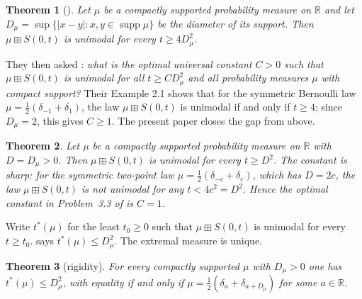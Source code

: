 \documentclass[11pt]{amsart}
\newtheorem{theorem}{Theorem}[section]
\theoremstyle{definition}
\newcommand{\R}{\mathbb{R}}
\newcommand{\bp}{\boxplus}
\newcommand{\supp}{\operatorname{supp}}
\begin{document}
\begin{theorem}[{\cite[Theorem 3.2]{HasebeUeda}}]\label{thm:HU}
Let $\mu$ be a compactly supported probability measure on $\R$ and let $D_\mu=\sup\{|x-y|: x,y\in\supp\mu\}$ be the diameter of its support. Then $\mu\bp S(0,t)$ is unimodal for every $t\ge 4D_\mu^2$.
\end{theorem}

They then asked \cite[Problem 3.3]{HasebeUeda}: \emph{what is the optimal universal constant $C>0$ such that $\mu\bp S(0,t)$ is unimodal for all $t\ge CD_\mu^2$ and all probability measures $\mu$ with compact support?} Their Example 2.1 shows that for the symmetric Bernoulli law $\mu=\frac12(\delta_{-1}+\delta_1)$, the law $\mu\bp S(0,t)$ is unimodal if and only if $t\ge 4$; since $D_\mu=2$, this gives $C\ge 1$. The present paper closes the gap from above.

\begin{theorem}\label{thm:main}
Let $\mu$ be a compactly supported probability measure on $\R$ with $D=D_\mu>0$. Then $\mu\bp S(0,t)$ is unimodal for every $t\ge D^2$. The constant is sharp: for the symmetric two-point law $\mu=\frac12(\delta_{-c}+\delta_c)$, which has $D=2c$, the law $\mu\bp S(0,t)$ is not unimodal for any $t<4c^2=D^2$. Hence the optimal constant in Problem~3.3 of \cite{HasebeUeda} is $C=1$.
\end{theorem}

Write $t^*(\mu)$ for the least $t_0\ge 0$ such that $\mu\bp S(0,t)$ is unimodal for every $t\ge t_0$.  says $t^*(\mu)\le D_\mu^2$. The extremal measure is unique.

\begin{theorem}[rigidity]\label{thm:rigid}
For every compactly supported $\mu$ with $D_\mu>0$ one has $t^*(\mu)\le D_\mu^2$, with equality if and only if $\mu=\frac12(\delta_{a}+\delta_{a+D_\mu})$ for some $a\in\R$.
\end{theorem}
\end{document}

